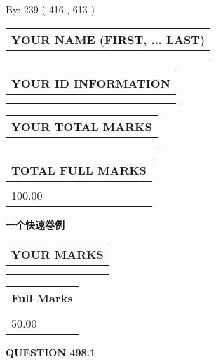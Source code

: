 \documentclass{ctexart}
\begin{document}
   
\hspace{1.0in} By: 
 239 ( 416 ,  613 )
   
   
   
   
\newpage 
\setcounter{page}{ 
   498001 } 
   
   
   
   
\noindent\begin{tabular}{|l|}
\hline
YOUR NAME (FIRST, ... LAST)  \\
\hline
 \\ 
 \\ 
\hline
\end{tabular}
\hspace{0.05in} \begin{tabular}{|l|}
\hline
 YOUR   ID   INFORMATION  \\
\hline
 \\ 
 \\ 
\hline
\end{tabular}
   
   
\vspace{0.2in}\noindent\begin{tabular}{|l|}
\hline
YOUR TOTAL MARKS  \\
\hline
 \\ 
 \\ 
\hline
\end{tabular}
\hspace{0.05in} \begin{tabular}{|l|}
\hline
TOTAL FULL MARKS  \\
\hline
 \\ 
100.00 \\
\hline
\end{tabular}
   
   
 \vspace{0.2in}
{\LARGE {\textbf{ 一个快速卷例}}}
   
   
  
\vspace{0.2in}
  
\noindent\begin{tabular}{|l|}
\hline
 YOUR MARKS  \\
\hline
 \\ 
 \\ 
\hline
\end{tabular}
\hspace{0.05in} \begin{tabular}{|l|}
\hline
 Full Marks  \\
\hline
 \\ 
50.00 \\
\hline
\end{tabular}
{\textbf{\Large{QUESTION
498.1 
}}}
  
\end{document}
